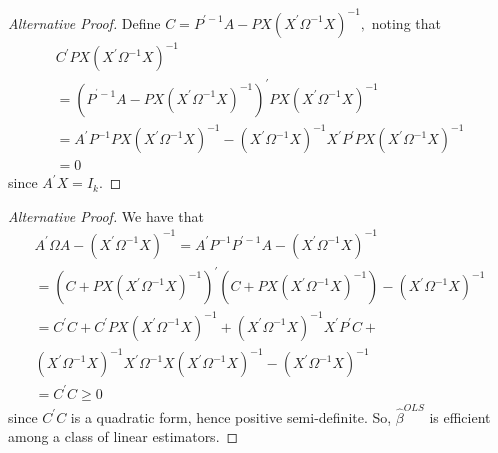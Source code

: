 \documentclass[notes=show]{beamer}
\begin{document}
\begin{frame}%

\begin{proof}[Alternative Proof]
Define $C=P^{\prime -1}A-PX\left( X^{\prime }\Omega ^{-1}X\right) ^{-1},$
noting that 
\begin{gather*}
C^{\prime }PX\left( X^{\prime }\Omega ^{-1}X\right) ^{-1} \\
=\left( P^{^{\prime }-1}A-PX\left( X^{\prime }\Omega ^{-1}X\right)
^{-1}\right) ^{\prime }PX\left( X^{\prime }\Omega ^{-1}X\right) ^{-1} \\
=A^{\prime }P^{-1}PX\left( X^{\prime }\Omega ^{-1}X\right) ^{-1}-\left(
X^{\prime }\Omega ^{-1}X\right) ^{-1}X^{\prime }P^{\prime }PX\left(
X^{\prime }\Omega ^{-1}X\right) ^{-1} \\
=0
\end{gather*}%
since $A^{\prime }X=I_{k}.$
\end{proof}

\end{frame}%

\begin{frame}%

\begin{proof}[Alternative Proof]
We have that 
\begin{gather*}
A^{\prime }\Omega A-(X^{\prime }\Omega ^{-1}X)^{-1}=A^{\prime
}P^{-1}P^{\prime -1}A-(X^{\prime }\Omega ^{-1}X)^{-1} \\
=\left( C+PX\left( X^{\prime }\Omega ^{-1}X\right) ^{-1}\right) ^{\prime
}\left( C+PX\left( X^{\prime }\Omega ^{-1}X\right) ^{-1}\right) -(X^{\prime
}\Omega ^{-1}X)^{-1} \\
=C^{\prime }C+C^{\prime }PX\left( X^{\prime }\Omega ^{-1}X\right)
^{-1}+\left( X^{\prime }\Omega ^{-1}X\right) ^{-1}X^{\prime }P^{\prime }C+ \\
\left( X^{\prime }\Omega ^{-1}X\right) ^{-1}X^{\prime }\Omega ^{-1}X\left(
X^{\prime }\Omega ^{-1}X\right) ^{-1}-(X^{\prime }\Omega ^{-1}X)^{-1} \\
=C^{\prime }C\geq 0
\end{gather*}%
since $C^{\prime }C$ is a quadratic form, hence positive semi-definite. So, $%
\widehat{\beta }^{OLS}$ is efficient among a class of linear estimators.
\end{proof}

\end{frame}%
\end{document}
